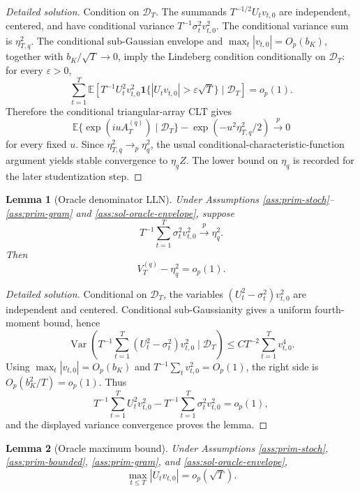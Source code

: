 \documentclass[12pt]{article}
\numberwithin{equation}{section}
\newtheorem{lemma}{Lemma}
\theoremstyle{definition}
\newcommand{\ind}{\mathbf 1}
\newcommand{\E}{\mathbb E}
\newcommand{\D}{\mathcal D}
\begin{document}
\begin{proof}[Detailed solution]
Condition on \(\D_T\).  The summands
\(T^{-1/2}U_tv_{t,0}\) are independent, centered, and have conditional
variance \(T^{-1}\sigma_t^2v_{t,0}^2\).  The conditional variance sum is
\(\eta_{T,q}^2\).  The conditional sub-Gaussian envelope and
\(\max_t|v_{t,0}|=O_p(b_K)\), together with
\(b_K/\sqrt T\to0\), imply the Lindeberg condition conditionally on \(\D_T\):
for every \(\varepsilon>0\),
\[
    \sum_{t=1}^T
    \E\left[ T^{-1}U_t^2v_{t,0}^2
    \ind\{|U_tv_{t,0}|>\varepsilon\sqrt T\}\mid\D_T\right]
    =o_p(1).
\]
Therefore the conditional triangular-array CLT gives
\[
    \E\{\exp(iuA_T^{(q)})\mid\D_T\}
    -\exp(-u^2\eta_{T,q}^2/2)\xrightarrow{p}0
\]
for every fixed \(u\).  Since \(\eta_{T,q}^2\to_p\eta_q^2\), the usual
conditional-characteristic-function argument yields stable convergence to
\(\eta_qZ\).  The lower bound on \(\eta_q\) is recorded for the later
studentization step.
\end{proof}

\begin{lemma}[Oracle denominator LLN]
\label{lem:wb-oracle-lln}
Under Assumptions \ref{ass:prim-stoch}--\ref{ass:prim-gram} and
\ref{ass:sol-oracle-envelope}, suppose
\[
    T^{-1}\sum_{t=1}^T \sigma_t^2v_{t,0}^2\xrightarrow{p}\eta_q^2.
\]
Then
\[
    V_T^{(q)}-\eta_q^2=o_p(1).
\]
\end{lemma}

\begin{proof}[Detailed solution]
Conditional on \(\D_T\), the variables
\((U_t^2-\sigma_t^2)v_{t,0}^2\) are independent and centered.  Conditional
sub-Gaussianity gives a uniform fourth-moment bound, hence
\[
    \operatorname{Var}\left(
    T^{-1}\sum_{t=1}^T (U_t^2-\sigma_t^2)v_{t,0}^2
    \mid\D_T\right)
    \leq CT^{-2}\sum_{t=1}^Tv_{t,0}^4.
\]
Using \(\max_t|v_{t,0}|=O_p(b_K)\) and
\(T^{-1}\sum_t v_{t,0}^2=O_p(1)\), the right side is
\(O_p(b_K^2/T)=o_p(1)\).  Thus
\[
    T^{-1}\sum_{t=1}^T U_t^2v_{t,0}^2
    -T^{-1}\sum_{t=1}^T \sigma_t^2v_{t,0}^2=o_p(1),
\]
and the displayed variance convergence proves the lemma.
\end{proof}

\begin{lemma}[Oracle maximum bound]
\label{lem:wb-oracle-max}
Under Assumptions \ref{ass:prim-stoch}, \ref{ass:prim-bounded},
\ref{ass:prim-gram}, and \ref{ass:sol-oracle-envelope},
\[
    \max_{t\leq T}|U_tv_{t,0}|=o_p(\sqrt T).
\]
\end{lemma}
\end{document}
